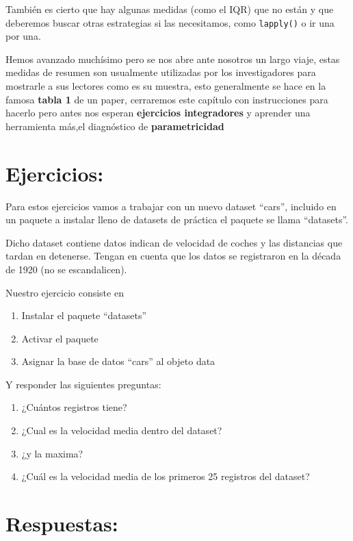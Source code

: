 \documentclass[
]{book}
\begin{document}
También es cierto que hay algunas medidas (como el IQR) que no están y que deberemos buscar otras estrategias si las necesitamos, como \texttt{lapply()} o ir una por una.

Hemos avanzado muchísimo pero se nos abre ante nosotros un largo viaje, estas medidas de resumen son usualmente utilizadas por los investigadores para mostrarle a sus lectores como es su muestra, esto generalmente se hace en la famosa \textbf{tabla 1} de un paper, cerraremos este capítulo con instrucciones para hacerlo pero antes nos esperan \textbf{ejercicios integradores} y aprender una herramienta más,el diagnóstico de \textbf{parametricidad}

\hypertarget{ejercicios-3}{%
\section{\texorpdfstring{ Ejercicios:}{ Ejercicios:}}\label{ejercicios-3}}

Para estos ejercicios vamos a trabajar con un nuevo dataset ``cars'', incluido en un paquete a instalar lleno de datasets de práctica el paquete se llama ``datasets''.

Dicho dataset contiene datos indican de velocidad de coches y las distancias que tardan en detenerse. Tengan en cuenta que los datos se registraron en la década de 1920 (no se escandalicen).

Nuestro ejercicio consiste en

\begin{enumerate}
\def\labelenumi{\arabic{enumi}.}
\item
  Instalar el paquete ``datasets''
\item
  Activar el paquete
\item
  Asignar la base de datos ``cars'' al objeto data
\end{enumerate}

Y responder las siguientes preguntas:

\begin{enumerate}
\def\labelenumi{\arabic{enumi}.}
\setcounter{enumi}{3}
\item
  ¿Cuántos registros tiene?
\item
  ¿Cual es la velocidad media dentro del dataset?
\item
  ¿y la maxima?
\item
  ¿Cuál es la velocidad media de los primeros 25 registros del dataset?
\end{enumerate}

\hypertarget{respuestas-1}{%
\section{\texorpdfstring{ Respuestas:}{ Respuestas:}}\label{respuestas-1}}
\end{document}
